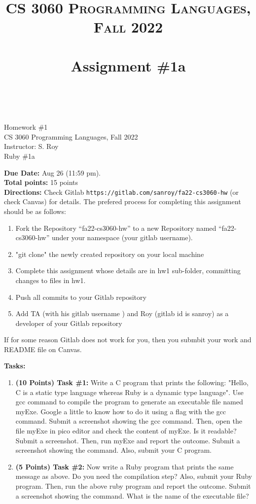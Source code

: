 \documentclass[paper=letter, fontsize=11pt]{scrartcl} %
\title{ 
    \normalfont \normalsize 
    \textsc{CS 3060 Programming Languages, Fall 2022} \\ [25pt] %
    \horrule{0.5pt} \\[0.4cm] %
    \huge Assignment \#1a  \\ %
    \horrule{2pt} \\[0.5cm] %
}
\begin{document}
    \begin{center}
         Homework \#1\\
        \small CS 3060 Programming Languages, Fall 2022 \\
        \small Instructor: S. Roy \\
        \huge Ruby \#1a
    \end{center}
    
    \textbf{Due Date:}  Aug 26 (11:59 pm).\\

    \textbf{Total points:} 15 points \\

    \textbf{Directions:} 
Check Gitlab \@ \texttt{https://gitlab.com/sanroy/fa22-cs3060-hw} (or check Canvas) for details. 
The prefered process for completing this assignment should be as follows:

    \begin{enumerate}[noitemsep]
        \item Fork the Repository ``fa22-cs3060-hw'' to a new Repository named ``fa22-cs3060-hw'' 
under your namespace (your gitlab username).
        \item "git clone" the newly created repository on your local machine
        \item Complete this assignment whose details are in hw1 sub-folder, committing changes to files in hw1. 
        \item Push all commits to your Gitlab repository
        \item Add TA (with his gitlab username ) and Roy (gitlab id is sanroy) as a developer of your Gitlab repository
    \end{enumerate}

If for some reason Gitlab does not work for you, then you submbit your work and README file on Canvas.

    \textbf{Tasks:}
    \begin{enumerate}[noitemsep]

         \item \textbf{(10 Points) Task \#1:} Write a C program that prints the following: 
"Hello, C is a static type language whereas Ruby is a dynamic type language". 
Use gcc command to compile the program to generate an executable file named myExe. Google a little to know
how to do it using a flag with the gcc command. Submit a screenshot showing the gcc command. 
Then, open the file myExe in pico editor and check the content of myExe. Is it readable? Submit a screenshot. 
Then, run myExe and report the outcome. Submit a screenshot showing the command. Also, submit your C program.

\item \textbf{(5 Points) Task \#2:}
Now write  a Ruby program that prints the same message as above. 
Do you need the compilation step? Also, submit your Ruby program.  
Then, run the above ruby program and report the outcome. Submit a screenshot showing the command.
What is the name of the executable file?    
\end{enumerate}
 
\end{document}
